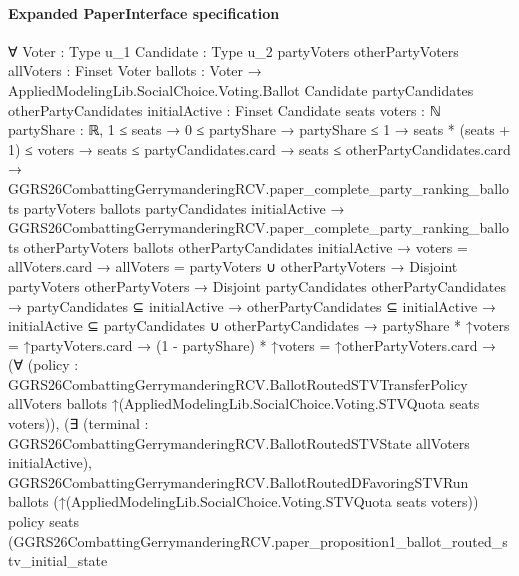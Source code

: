 \documentclass[10pt]{article}
\begin{document}
\paragraph{Expanded PaperInterface specification}
\begin{ReviewVerbatim}
∀ {Voter : Type u_1} {Candidate : Type u_2} {partyVoters otherPartyVoters allVoters : Finset Voter}
  {ballots : Voter → AppliedModelingLib.SocialChoice.Voting.Ballot Candidate}
  {partyCandidates otherPartyCandidates initialActive : Finset Candidate} {seats voters : ℕ} {partyShare : ℝ},
  1 ≤ seats →
    0 ≤ partyShare →
      partyShare ≤ 1 →
        seats * (seats + 1) ≤ voters →
          seats ≤ partyCandidates.card →
            seats ≤ otherPartyCandidates.card →
              GGRS26CombattingGerrymanderingRCV.paper_complete_party_ranking_ballots partyVoters ballots partyCandidates
                  initialActive →
                GGRS26CombattingGerrymanderingRCV.paper_complete_party_ranking_ballots otherPartyVoters ballots
                    otherPartyCandidates initialActive →
                  voters = allVoters.card →
                    allVoters = partyVoters ∪ otherPartyVoters →
                      Disjoint partyVoters otherPartyVoters →
                        Disjoint partyCandidates otherPartyCandidates →
                          partyCandidates ⊆ initialActive →
                            otherPartyCandidates ⊆ initialActive →
                              initialActive ⊆ partyCandidates ∪ otherPartyCandidates →
                                partyShare * ↑voters = ↑partyVoters.card →
                                  (1 - partyShare) * ↑voters = ↑otherPartyVoters.card →
                                    (∀
                                        (policy :
                                          GGRS26CombattingGerrymanderingRCV.BallotRoutedSTVTransferPolicy allVoters
                                            ballots ↑(AppliedModelingLib.SocialChoice.Voting.STVQuota seats voters)),
                                        (∃ (terminal :
                                            GGRS26CombattingGerrymanderingRCV.BallotRoutedSTVState allVoters
                                              initialActive),
                                            GGRS26CombattingGerrymanderingRCV.BallotRoutedDFavoringSTVRun ballots
                                                (↑(AppliedModelingLib.SocialChoice.Voting.STVQuota seats voters)) policy
                                                seats
                                                (GGRS26CombattingGerrymanderingRCV.paper_proposition1_ballot_routed_stv_initial_state

\end{ReviewVerbatim}
\end{document}
